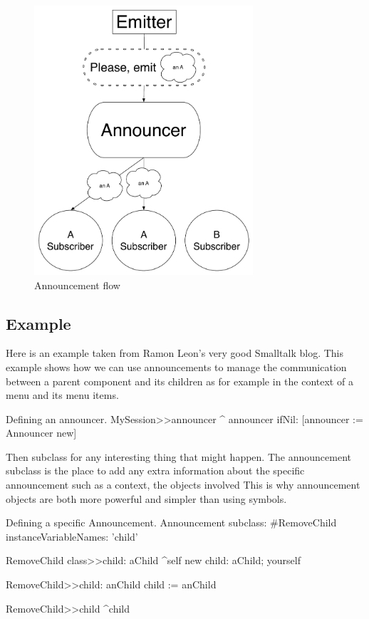 \documentclass[a4paper,10pt,twoside]{book}
\begin{document}
\begin{figure}[ht]\centering
	\includegraphics[height=10cm]{AnnouncementFlow}
	\caption{Announcement flow}
	\label{fig:announcementFlow}
\end{figure} 

\subsection{Example} Here is an example taken from Ramon Leon's
very good Smalltalk blog. This example shows how we can use
announcements to manage the communication between a parent component
and its children as for example in the context of a menu and its menu
items.

\begin{method}{Defining an announcer.}
MySession>>announcer
    ^ announcer ifNil: [announcer := Announcer new]
\end{method}

Then subclass  for any interesting thing that
might happen. The announcement subclass is the place to add any extra
information about the specific announcement such as a context, the
objects involved \etc This is why announcement objects are both more
powerful and simpler than using symbols.

\begin{classdef}{Defining a specific Announcement.}
Announcement subclass: #RemoveChild
    instanceVariableNames: 'child'

RemoveChild class>>child: aChild
    ^self new
        child: aChild;
        yourself

RemoveChild>>child: anChild
    child := anChild

RemoveChild>>child
    ^child
\end{classdef}
\end{document}
